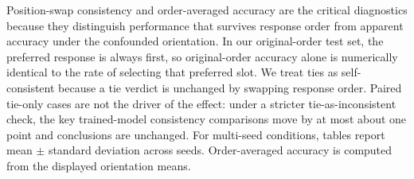\documentclass[letterpaper]{article}
\begin{document}
Position-swap consistency and order-averaged accuracy are the critical diagnostics because they distinguish performance that survives response order from apparent accuracy under the confounded orientation. In our original-order test set, the preferred response is always first, so original-order accuracy alone is numerically identical to the rate of selecting that preferred slot. We treat ties as self-consistent because a tie verdict is unchanged by swapping response order. Paired tie-only cases are not the driver of the effect: under a stricter tie-as-inconsistent check, the key trained-model consistency comparisons move by at most about one point and conclusions are unchanged. For multi-seed conditions, tables report mean $\pm$ standard deviation across seeds. Order-averaged accuracy is computed from the displayed orientation means.
\end{document}

